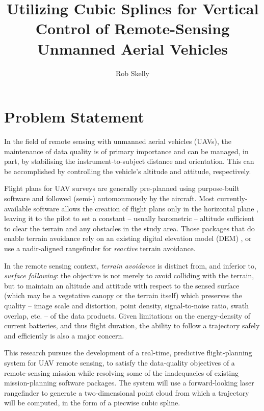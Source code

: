 \documentclass[doc]{apa6}
\title{Utilizing Cubic Splines for Vertical Control of Remote-Sensing Unmanned Aerial Vehicles}
\author{Rob Skelly}
\affiliation{University of Victoria}
\begin{document}
\maketitle

\section{Problem Statement}

In the field of remote sensing with unmanned aerial vehicles (UAVs), the maintenance of data quality is of primary importance and can be managed, in part, by stabilising the instrument-to-subject distance and orientation. This can be accomplished by controlling the vehicle's altitude and attitude, respectively.

Flight plans for UAV surveys are generally pre-planned using purpose-built software and followed (semi-) automonmously by the aircraft. Most currently-available software allows the creation of flight plans only in the horizontal plane \parencite[e.g.,][]{ArduPilot2018,DJI2018a,Microdrones2018,Group2018,UAVToolbox2018}, leaving it to the pilot to set a constant -- usually barometric -- altitude sufficient to clear the terrain and any obstacles in the study area. Those packages that do enable terrain avoidance rely on an  existing digital elevation model (DEM) \parencite[e.g.,][]{PrecisionHawk2018,UgCS2018,MapsMadeEasy2018}, or use a nadir-aligned rangefinder for \emph{reactive} terrain avoidance.

In the remote sensing context, \emph{terrain avoidance} is distinct from, and inferior to, \emph{surface following}: the objective is not merely to avoid colliding with the terrain, but to maintain an altitude and attitude with respect to the sensed surface (which may be a vegetative canopy or the terrain itself) which preserves the quality -- image scale and distortion, point density, signal-to-noise ratio, swath overlap, etc. -- of the data products. Given limitations on the energy-density of current batteries, and thus flight duration, the ability to follow a trajectory safely and efficiently is also a major concern.

This research pursues the development of a real-time, predictive flight-planning system for UAV remote sensing, to satisfy the data-quality objectives of a remote-sensing mission while resolving some of the inadequacies of existing mission-planning software packages. The system will use a forward-looking laser rangefinder to generate a two-dimensional point cloud from which a trajectory will be computed, in the form of a piecwise cubic spline. 
\end{document}
